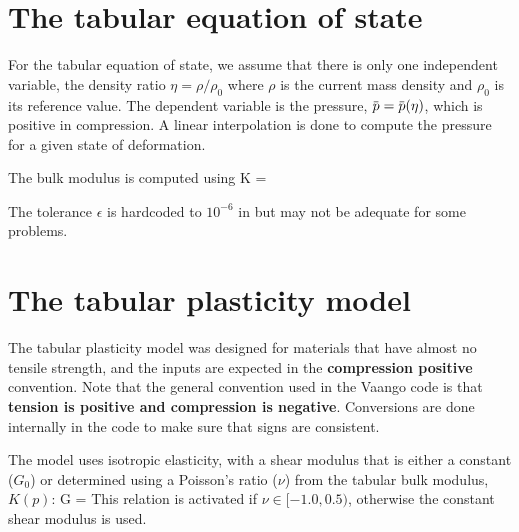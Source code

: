 \section{The tabular equation of state}
For the tabular equation of state, we assume that there is only one independent variable,
the density ratio $\eta = \rho/\rho_0$ where $\rho$ is the current mass density and $\rho_0$ is
its reference value.  The dependent variable is the pressure, $\pbar = \pbar(\eta)$, which is
positive in compression.  A linear interpolation is done to compute the pressure
for a given state of deformation.

The bulk modulus is computed using
\Beq
  K = \rho {}
\Eeq
\begin{WarningBox}
The tolerance $\epsilon$ is hardcoded to $10^{-6}$ in \Vaango but
may not be adequate for some problems.
\end{WarningBox}

\section{The tabular plasticity model}
The tabular plasticity model was designed for materials that have almost no tensile strength, and
the inputs are expected in the \textbf{compression positive} convention.  Note that the general
convention used in the Vaango code is that \textbf{tension is positive and compression is negative}.
Conversions are done internally in the code to make sure that signs are consistent.

The model uses isotropic elasticity, with a shear modulus that is either a constant ($G_0$) or 
determined using a Poisson's ratio ($\nu$) from the tabular bulk modulus, $K(p)$:
\Beq
  G = 
\Eeq
This relation is activated if $\nu \in [-1.0, 0.5)$, otherwise the constant shear modulus
is used.

